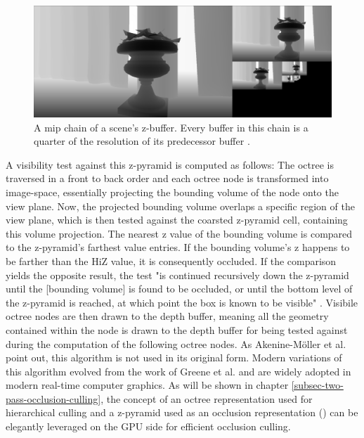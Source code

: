 \begin{figure}[h]
    \centering
    \includegraphics[width=\linewidth]{images/graphics/hiz-mip-chain.png}
    \caption{A mip chain of a scene's z-buffer. Every buffer in this chain is a quarter of the resolution of its 
    predecessor buffer \cite{Schachtschabel2017}.}
    \label{fig:hiz-mip-chain}
\end{figure}

\noindent
A visibility test against this z-pyramid is computed as follows: The octree is traversed in a front to back order 
and each octree node is transformed into image-space, essentially projecting the bounding volume of the node onto 
the view plane. Now, the projected bounding volume overlaps a specific region of the view plane, which is then 
tested against the coarsted z-pyramid cell, containing this volume projection. The nearest z value of the bounding 
volume is compared to the z-pyramid's farthest value entries. If the bounding volume's z happens to be farther than the 
\ac{HiZ} value, it is consequently occluded. If the comparison yields the opposite result, the test "is continued 
recursively down the z-pyramid until the [bounding volume] is found to be occluded, or until the bottom level of the 
z-pyramid is reached, at which point the box is known to be visible" \cite{AkenineMoeller2018}. Visibile octree nodes 
are then drawn to the depth buffer, meaning all the geometry contained within the node is drawn to the depth buffer 
for being tested against during the computation of the following octree nodes. As Akenine-Möller et al. 
\cite{AkenineMoeller2018} point out, this algorithm is not used in its original form. Modern variations of this 
algorithm evolved from the work of Greene et al. \cite{Greene93} and are widely adopted in modern real-time computer 
graphics. As will be shown in chapter \ref{subsec-two-pass-occlusion-culling}, the concept of an octree representation 
used for hierarchical culling and a z-pyramid used as an occlusion representation (\cite{AkenineMoeller2018}) can be 
elegantly leveraged on the \ac{GPU} side for efficient occlusion culling.



